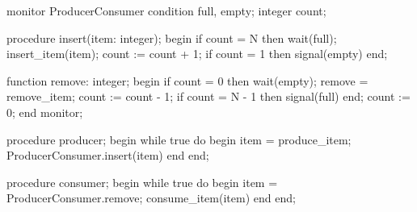 \documentclass[varwidth=42em,crop]{standalone}
\begin{document}
\begin{minipage}[t]{.48\linewidth}
\begin{pascalcode}
monitor ProducerConsumer
  condition full, empty;
  integer count;

  procedure insert(item: integer);
  begin
    if count = N then wait(full);
    insert_item(item);
    count := count + 1;
    if count = 1 then signal(empty)
  end;
      
  function remove: integer;
  begin
    if count = 0 then wait(empty);
    remove = remove_item;
    count := count - 1;
    if count = N - 1 then signal(full)
  end;
  count := 0;
end monitor;  
\end{pascalcode}
\end{minipage}\qquad\quad
\begin{minipage}[t]{.48\linewidth}
\vspace{1em}
\begin{pascalcode}
procedure producer;
begin
  while true do
  begin
    item = produce_item;
    ProducerConsumer.insert(item)
  end
end;

procedure consumer;
begin
  while true do
  begin
    item = ProducerConsumer.remove;
    consume_item(item)
  end
end;  
\end{pascalcode}  
\end{minipage}
\end{document}

